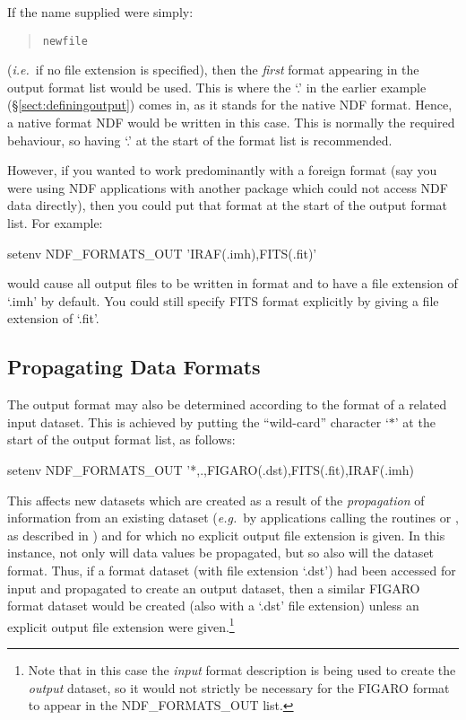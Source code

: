 \documentclass[11pt,twoside,nolof]{starlink}
\providecommand{\file}[1]{{\tt{#1}}}
\providecommand{\st}[1]{{\em{#1}}}
\begin{document}
If the name supplied were simply:

\begin{quote}
\file{newfile}
\end{quote}

(\st{i.e.}\ if no file extension is specified), then the \st{first}
format appearing in the output format list would be used. This is
where the `.' in the earlier example (\S\ref{sect:definingoutput})
comes in, as it stands for the native NDF format. Hence, a native
format NDF would be written in this case. This is normally the
required behaviour, so having `.' at the start of the format list is
recommended.

However, if you wanted to work predominantly with a foreign format
(say you were using NDF applications with another package which could
not access NDF data directly), then you could put that format at the
start of the output format list. For example:

\begin{terminalv}
setenv NDF_FORMATS_OUT 'IRAF(.imh),FITS(.fit)'
\end{terminalv}

would cause all output files to be written in 
format and to have a file extension of `.imh' by default. You could
still specify FITS format explicitly by giving a file extension of
`.fit'.

\subsection{Propagating Data Formats}

The output format may also be determined according to the format of a
related input dataset. This is achieved by putting the ``wild-card''
character `$*$' at the start of the output format list, as follows:

\begin{terminalv}
setenv NDF_FORMATS_OUT '*,.,FIGARO(.dst),FITS(.fit),IRAF(.imh)
\end{terminalv}

This affects new datasets which are created as a result of the
\st{propagation} of information from an existing dataset
(\st{e.g.}\ by applications calling the routines
 or
, as described in
) and for which no explicit
output file extension is given. In this instance, not only will data
values be propagated, but so also will the dataset format.  Thus, if a
 format dataset (with file extension `.dst') had
been accessed for input and propagated to create an output dataset,
then a similar FIGARO format dataset would be created (also with a
`.dst' file extension) unless an explicit output file extension were
given.\footnote{Note that in this case the \st{input} format
description is being used to create the \st{output} dataset, so it
would not strictly be necessary for the FIGARO format to appear in the
NDF\_FORMATS\_OUT list.}
\end{document}
